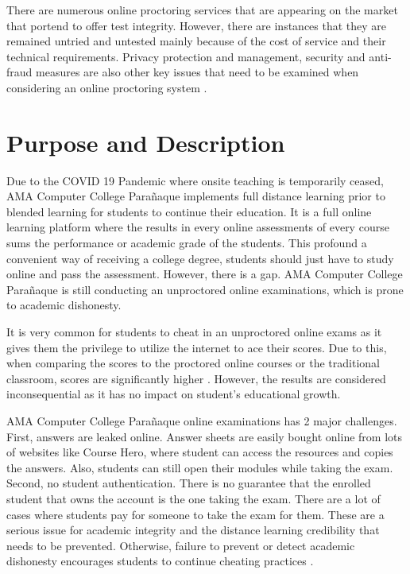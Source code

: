 There are numerous online proctoring services that are appearing on the market that portend to offer test integrity.
However, there are instances that they are remained untried and untested mainly because of the cost of service and their technical requirements.
Privacy protection and management, security and anti-fraud measures are also other key issues that need to be examined when considering an online proctoring system \cite{sietses2016white}.

\section{Purpose and Description}

Due to the COVID 19 Pandemic where onsite teaching is temporarily ceased, AMA Computer College Parañaque implements full distance learning prior to blended learning for students to continue their education.
It is a full online learning platform where the results in every online assessments of every course sums the performance or academic grade of the students.
This profound a convenient way of receiving a college degree, students should just have to study online and pass the assessment.
However, there is a gap.
AMA Computer College Parañaque is still conducting an unproctored online examinations, which is prone to academic dishonesty.

It is very common for students to cheat in an unproctored online exams as it gives them the privilege to utilize the internet to ace their scores.
Due to this, when comparing the scores to the proctored online courses or the traditional classroom, scores are significantly higher \cite{weiner2017comparative}.
However, the results are considered inconsequential as it has no impact on student’s educational growth.

AMA Computer College Parañaque online examinations has 2 major challenges.
First, answers are leaked online.
Answer sheets are easily bought online from lots of websites like Course Hero, where student can access the resources and copies the answers.
Also, students can still open their modules while taking the exam.
Second, no student authentication.
There is no guarantee that the enrolled student that owns the account is the one taking the exam.
There are a lot of cases where students pay for someone to take the exam for them.
These are a serious issue for academic integrity and the distance learning credibility that needs to be prevented.
Otherwise, failure to prevent or detect academic dishonesty encourages students to continue cheating practices \cite{teh2013reducing}.

